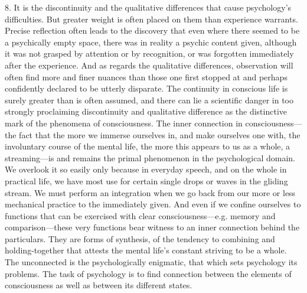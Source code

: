 \documentclass[12pt,a4paper]{book}
\newcommand{\opage}[1]{\marginnote{\footnotesize\textit{[#1]}}}
\begin{document}
8. It is the discontinuity and the qualitative differences that cause
psychology's difficulties. But greater weight is often placed on them
than experience warrants. Precise reflection often leads to the
discovery that even where there seemed to be a \opage{28}psychically empty space,
there was in reality a psychic content given, although it was not grasped
by attention or by recognition, or was forgotten immediately after the
experience. And as regards the qualitative differences, observation will
often find more and finer nuances than those one first stopped at and
perhaps confidently declared to be utterly disparate. The continuity in
conscious life is surely greater than is often assumed, and there can
lie a scientific danger in too strongly proclaiming discontinuity and
qualitative difference as the distinctive mark of the phenomena of
consciousness. The inner connection in consciousness---the fact that the
more we immerse ourselves in, and make ourselves one with, the
involuntary course of the mental life, the more this appears to us as a
whole, a streaming---is and remains the primal phenomenon in the
psychological domain. We overlook it so easily only because in everyday
speech, and on the whole in practical life, we have most use for certain
single drops or waves in the gliding stream. We must perform an
integration when we go back from our more or less mechanical practice to
the immediately given. And even if we confine ourselves to functions
that can be exercised with clear consciousness---e.g. memory and
comparison---these very functions bear witness to an inner connection
behind the particulars. They are forms of synthesis, of the tendency to
combining and holding-together that attests the mental life's constant
striving to be a whole. The unconnected is the psychologically
enigmatic, that which sets psychology its problems. The task of
psychology is to find connection between the elements of consciousness
as well as between its different states.
\end{document}
